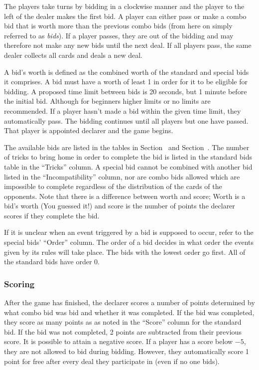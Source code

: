 \documentclass[a4paper]{article}
\begin{document}
				The players take turns by bidding in a clockwise manner and the player to the left of the dealer makes the first bid. A player can either pass or make a combo bid that is worth more than the previous combo bids (from here on simply referred to as \emph{bids}). If a player passes, they are out of the bidding and may therefore not make any new bids until the next deal. If all players pass, the same dealer collects all cards and deals a new deal.

				A bid's worth is defined as the combined worth of the standard and special bids it comprises. A bid must have a worth of least 1 in order for it to be eligible for bidding. A proposed time limit between bids is 20 seconds, but 1 minute before the initial bid. Although for beginners higher limits or no limits are recommended. If a player hasn't made a bid within the given time limit, they automatically pass. The bidding continues until all players but one have passed. That player is appointed declarer and the game begins.

				The available bids are listed in the tables in Section~ and Section~. The number of tricks to bring home in order to complete the bid is listed in the standard bids table in the ``Tricks'' column. A special bid cannot be combined with another bid listed in the ``Incompatibility'' column, nor are combo bids allowed which are impossible to complete regardless of the distribution of the cards of the opponents. Note that there is a difference between worth and score; Worth is a bid's worth (You guessed it!) and score is the number of points the declarer scores if they complete the bid.

				If it is unclear when an event triggered by a bid is supposed to occur, refer to the special bids' ``Order'' column. The order of a bid decides in what order the events given by its rules will take place. The bids with the lowest order go first. All of the standard bids have order 0.

			\subsubsection{Scoring}
				After the game has finished, the declarer scores a number of points determined by what combo bid was bid and whether it was completed. If the bid was completed, they score as many points as as noted in the ``Score'' column for the standard bid. If the bid was not completed, 2 points are subtracted from their previous score. It is possible to attain a negative score. If a player has a score below $-5$, they are not allowed to bid during bidding. However, they automatically score 1 point for free after every deal they participate in (even if no one bids).
\end{document}
